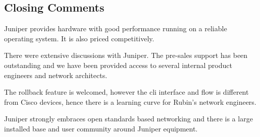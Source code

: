 \subsection{Closing Comments}

Juniper provides hardware with good performance running on a reliable operating system. It is also priced competitively.

There were extensive discussions with Juniper. The pre-sales support has been outstanding and we have been provided access to several internal product engineers and network architects.

The rollback feature is welcomed, however the cli interface and flow is different from Cisco devices, hence there is a learning curve for Rubin's network engineers. 

Juniper strongly embraces open standards based networking and there is a large installed base and user community around Juniper equipment.

